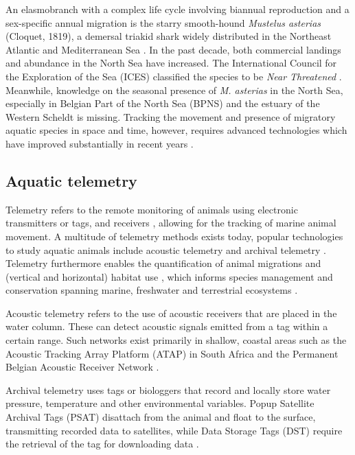 \documentclass[
  authoryear,
  review,
  3p]{elsarticle}
\begin{document}
An elasmobranch with a complex life cycle involving biannual
reproduction and a sex-specific annual migration is the starry
smooth-hound \emph{Mustelus asterias} (Cloquet, 1819), a demersal
triakid shark widely distributed in the Northeast Atlantic and
Mediterranean Sea \citep{breve_2016, griffiths_2020}. In the past
decade, both commercial landings \citep{ices_2022, bitonporsmoguer_2022}
and abundance in the North Sea \citep{mccullyphillips_2015} have
increased. The International Council for the Exploration of the Sea
(ICES) classified the species to be \emph{Near Threatened}
\citep{ices_2022}. Meanwhile, knowledge on the seasonal presence of
\emph{M. asterias} in the North Sea, especially in Belgian Part of the
North Sea (BPNS) and the estuary of the Western Scheldt is missing.
Tracking the movement and presence of migratory aquatic species in space
and time, however, requires advanced technologies which have improved
substantially in recent years \citep{whoriskey_2019}.

\hypertarget{aquatic-telemetry}{%
\subsection{Aquatic telemetry}\label{aquatic-telemetry}}

Telemetry refers to the remote monitoring of animals using electronic
transmitters or tags, and receivers \citep{whoriskey_2019}, allowing for
the tracking of marine animal movement. A multitude of telemetry methods
exists today, popular technologies to study aquatic animals include
acoustic telemetry and archival telemetry \citep{thorstad_2013}.
Telemetry furthermore enables the quantification of animal migrations
and (vertical and horizontal) habitat use \citep{hussey_2015}, which
informs species management and conservation spanning marine, freshwater
and terrestrial ecosystems \citep{beger_2010}.

Acoustic telemetry refers to the use of acoustic receivers that are
placed in the water column. These can detect acoustic signals emitted
from a tag within a certain range. Such networks exist primarily in
shallow, coastal areas \citep{hussey_2015} such as the Acoustic Tracking
Array Platform (ATAP) in South Africa \citep{cowley_2017} and the
Permanent Belgian Acoustic Receiver Network
\citep[PBARN,][]{reubens_2019}.

Archival telemetry uses tags or biologgers that record and locally store
water pressure, temperature and other environmental variables. Popup
Satellite Archival Tags (PSAT) disattach from the animal and float to
the surface, transmitting recorded data to satellites, while Data
Storage Tags (DST) require the retrieval of the tag for downloading data
\citep{thorstad_2013}.
\end{document}
